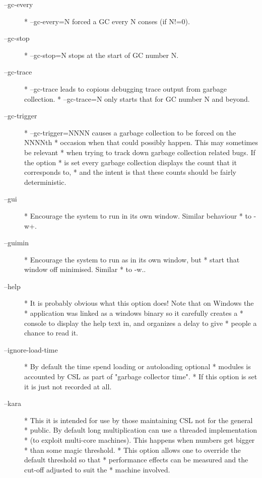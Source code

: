 \documentclass[a4paper,11pt]{article}
\begin{document}
\begin{description}
\item [{\ttfamily --gc-every}] 
          * --gc-every=N forced a GC every N conses (if N!=0).

\item [{\ttfamily --gc-stop}] 
          * --gc-stop=N stops at the start of GC number N.

\item [{\ttfamily --gc-trace}] 
          * --gc-trace leads to copious debugging trace output from garbage collection.
          * --gc-trace=N only starts that for GC number N and beyond.

\item [{\ttfamily --gc-trigger}] 
          * --gc-trigger=NNNN causes a garbage collection to be forced on the NNNNth
          * occasion when that could possibly happen. This may sometimes be relevant
          * when trying to track down garbage collection related bugs. If the option
          * is set every garbage collection displays the count that it corresponds to,
          * and the intent is that these counts should be fairly deterministic.

\item [{\ttfamily --gui}] 
          * Encourage the system to run in its own window. Similar behaviour
          * to {\ttfamily -w+}.

\item [{\ttfamily --guimin}] 
          * Encourage the system to run as in its own window, but
          * start that window off minimised. Similar
          * to {\ttfamily -w.}.

\item [{\ttfamily --help}] 
          * It is probably obvious what this option does! Note that on Windows the
          * application was linked as a windows binary so it carefully creates a
          * console to display the help text in, and organizes a delay to give
          * people a chance to read it.

\item [{\ttfamily --ignore-load-time}] 
          * By default the time spend loading or autoloading optional
          * modules is accounted by CSL as part of "garbage collector time".
          * If this option is set it is just not recorded at all.

\item [{\ttfamily --kara}] 
          * This it is intended for use by those maintaining CSL not for the general
          * public. By default long multiplication can use a threaded implementation
          * (to exploit multi-core machines). This happens when numbers get bigger
          * than some magic threshold.
          * This option allows one to override the default threshold so that
          * performance effects can be measured and the cut-off adjusted to suit the
          * machine involved.


\end{description}
\end{document}

